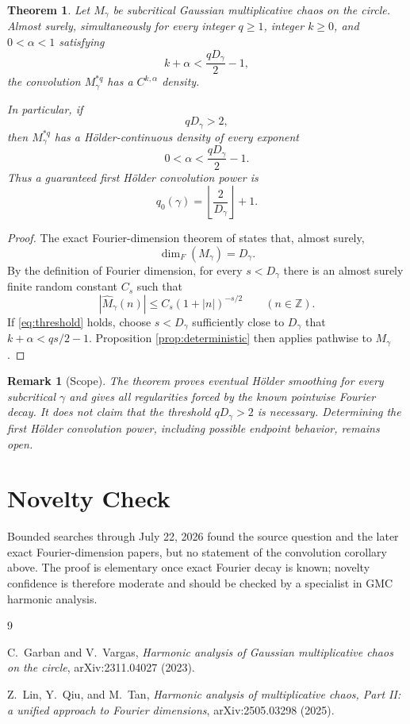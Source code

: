 \documentclass[11pt]{article}
\newtheorem{theorem}{Theorem}
\newtheorem{remark}{Remark}
\newcommand{\Z}{\mathbb Z}
\begin{document}
\begin{theorem}\label{thm:main}
Let $M_\gamma$ be subcritical Gaussian multiplicative chaos on the circle.
Almost surely, simultaneously for every integer $q\geq1$, integer $k\geq0$,
and $0<\alpha<1$ satisfying
\begin{equation}\label{eq:threshold}
                       k+\alpha<\frac{qD_\gamma}{2}-1,
\end{equation}
the convolution $M_\gamma^{*q}$ has a $C^{k,\alpha}$ density.

In particular, if
\[
                   qD_\gamma>2,
\]
then $M_\gamma^{*q}$ has a H\"older-continuous density of every exponent
\[
                  0<\alpha<\frac{qD_\gamma}{2}-1.
\]
Thus a guaranteed first H\"older convolution power is
\[
                  q_0(\gamma)=\left\lfloor\frac{2}{D_\gamma}\right\rfloor+1.
\]
\end{theorem}

\begin{proof}
The exact Fourier-dimension theorem of \cite{LinQiuTan} states that, almost
surely,
\[
                         \dim_F(M_\gamma)=D_\gamma.
\]
By the definition of Fourier dimension, for every $s<D_\gamma$ there is an
almost surely finite random constant $C_s$ such that
\[
              |\widehat M_\gamma(n)|\leq
              C_s(1+|n|)^{-s/2}\qquad(n\in\Z).
\]
If \eqref{eq:threshold} holds, choose $s<D_\gamma$ sufficiently close to
$D_\gamma$ that $k+\alpha<qs/2-1$.  Proposition
\ref{prop:deterministic} then applies pathwise to $M_\gamma$.
\end{proof}

\begin{remark}[Scope]
The theorem proves eventual H\"older smoothing for every subcritical
$\gamma$ and gives all regularities forced by the known pointwise Fourier
decay.  It does not claim that the threshold $qD_\gamma>2$ is necessary.
Determining the first H\"older convolution power, including possible
endpoint behavior, remains open.
\end{remark}

\section*{Novelty Check}

Bounded searches through July 22, 2026 found the source question and the
later exact Fourier-dimension papers, but no statement of the convolution
corollary above.  The proof is elementary once exact Fourier decay is known;
novelty confidence is therefore moderate and should be checked by a
specialist in GMC harmonic analysis.

\begin{thebibliography}{9}

C.~Garban and V.~Vargas,
\emph{Harmonic analysis of Gaussian multiplicative chaos on the circle},
arXiv:2311.04027 (2023).

Z.~Lin, Y.~Qiu, and M.~Tan,
\emph{Harmonic analysis of multiplicative chaos, Part II: a unified approach
to Fourier dimensions}, arXiv:2505.03298 (2025).

\end{thebibliography}
\end{document}
